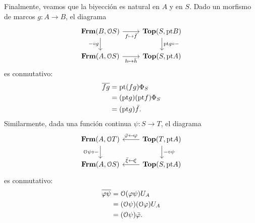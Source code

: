 \documentclass{comunicaciones}
\begin{document}
Finalmente, veamos que la biyección es natural en $A$ y en $S$.
Dado un morfismo de marcos $g:A\to B$, el diagrama
\[
    \begin{tikzcd}
        \Frm(B,\Cal OS) \ar[d,"{-}\circ g"'] \ar[r,"f\mapsto\bar f"']
        & \Top(S,\pt B)
        \ar[d,"\pt g\circ{-}"]
        \\
        \Frm(A,\Cal OS) \ar[r,"h\mapsto\bar h"']
        & \Top(S,\pt A)
    \end{tikzcd}
\]
es conmutativo:
\begin{align*}
    \overline{fg}
    &= \mathrm{pt}(f g)\Phi_S \\
    &= (\mathrm{pt} g)(\mathrm{pt} f)\Phi_S \\
    &= (\mathrm{pt} g)\bar f.
\end{align*}
Similarmente, dada una función continua $\psi:S\to T$,
el diagrama
\[
    \begin{tikzcd}
        \Frm(A,\Cal OT)
        \ar[d,"\Cal O\psi\circ{-}"']
        & \Top(T,\pt A) \ar[l,"\bar \phi\mapsfrom \phi"']
        \ar[d,"{-}\circ \psi"]
        \\
        \Frm(A,\Cal OS)
        & \Top(S,\pt A) \ar[l,"\bar \xi\mapsfrom \xi"']
    \end{tikzcd}
\]
es conmutativo:
\begin{align*}
    \overline{\varphi\psi}
    &= \mathcal{O}(\varphi\psi)U_A \\
    &= (\mathcal{O}\psi)(\mathcal{O}\varphi)U_A \\
    &= (\mathcal{O}\psi)\bar{\varphi}.
\end{align*}
\end{document}
